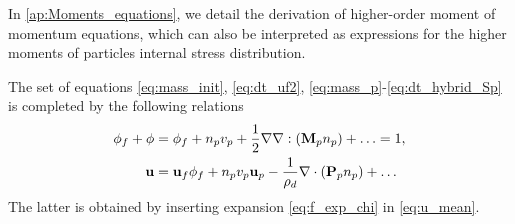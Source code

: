 In \ref{ap:Moments_equations}, we detail the derivation of higher-order moment of momentum equations, which can also be interpreted as expressions for the higher moments of particles internal stress distribution. 

The set of equations \ref{eq:mass_init}, \ref{eq:dt_uf2}, \ref{eq:mass_p}-\ref{eq:dt_hybrid_Sp} is completed by the following relations %
\begin{align}
    \phi_f + \phi &= 
    \phi_f +  n_pv_p + \frac{1}{2}\grad\grad : (\textbf{M}_p n_p) + \ldots = 1,
    \label{eq:volume_conservation}\\
    \textbf{u} &= \textbf{u}_f\phi_f + 
    n_pv_p\textbf{u}_p - \frac{1}{\rho_d} \div  (\textbf{P}_p n_p) + \ldots
    \label{eq:velocity_conservation}
\end{align}
The latter is obtained by inserting expansion \ref{eq:f_exp_chi} in \ref{eq:u_mean}.

